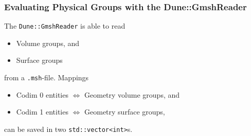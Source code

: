 \begin{frame}
  \frametitle<presentation>{Evaluating Physical Groups with the Dune::GmshReader}
  The \lstinline!Dune::GmshReader! is able to read
  \begin{itemize}
    \item Volume groups, and
    \item Surface groups
  \end{itemize}
  from a \lstinline!.msh!-file. Mappings
  \begin{itemize}
    \item Codim 0 entities $\Leftrightarrow$ Geometry volume groups, and
    \item Codim 1 entities $\Leftrightarrow$ Geometry surface groups,
  \end{itemize}
  can be saved in two \lstinline!std::vector<int>!s.
\end{frame}

